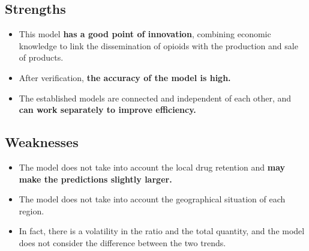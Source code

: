 \documentclass[12pt]{mcmthesis}
\begin{document}
\subsection{Strengths}
\begin{itemize}
\item This model\textbf{ has a good point of innovation}, combining economic knowledge to link the dissemination of opioids with the production and sale of products.
\item After verification, \textbf{the accuracy of the model is high.}
\item The established models are connected and independent of each other, and \textbf{can work separately to improve efficiency.}
\end{itemize}
\subsection{Weaknesses}
\begin{itemize}
\item The model does not take into account the local drug retention and \textbf{may make the predictions slightly larger.}
\item The model does not take into account the geographical situation of each region.
\item In fact, there is a volatility in the ratio and the total quantity, and the model does not consider the difference between the two trends.
\end{itemize}
\end{document}
